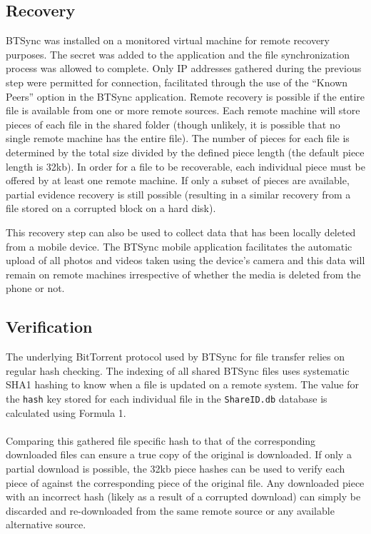 \documentclass{jdfsl}
\begin{document}
\subsection{Recovery}
\label{POC:Rec}
BTSync was installed on a monitored virtual machine for remote recovery purposes. The secret was added to the application and the file synchronization process was allowed to complete. Only IP addresses gathered during the previous step were permitted for connection, facilitated through the use of the ``Known Peers'' option in the BTSync application. Remote recovery is possible if the entire file is available from one or more remote sources. Each remote machine will store pieces of each file in the shared folder (though unlikely, it is possible that no single remote machine has the entire file). The number of pieces for each file is determined by the total size divided by the defined piece length (the default piece length is 32kb). In order for a file to be recoverable, each individual piece must be offered by at least one remote machine. If only a subset of pieces are available, partial evidence recovery is still possible (resulting in a similar recovery from a file stored on a corrupted block on a hard disk).

This recovery step can also be used to collect data that has been locally deleted from a mobile device. The BTSync mobile application facilitates the automatic upload of all photos and videos taken using the device's camera and this data will remain on remote machines irrespective of whether the media is deleted from the phone or not.\\


\subsection{Verification}
\label{POCVerification}

The underlying BitTorrent protocol used by BTSync for file transfer relies on regular hash checking. The indexing of all shared BTSync files uses systematic SHA1 hashing to know when a file is updated on a remote system. The value for the \texttt{hash} key stored for each individual file in the \texttt{ShareID.db} database is calculated using Formula 1.\\

\\

Comparing this gathered file specific hash to that of the corresponding downloaded files can ensure a true copy of the original is downloaded. If only a partial download is possible, the 32kb piece hashes can be used to verify each piece of against the corresponding piece of the original file. Any downloaded piece with an incorrect hash (likely as a result of a corrupted download) can simply be discarded and re-downloaded from the same remote source or any available alternative source. 
\end{document}

